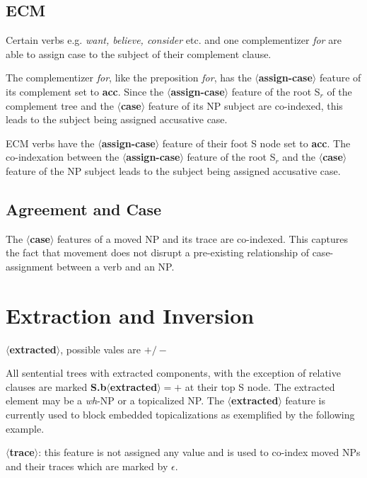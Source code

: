 \subsection{ECM}
Certain verbs e.g. {\em want, believe, consider} etc. and one complementizer
{\em for} are able to assign case to the subject of their complement clause. 

The complementizer {\em for}, like the preposition {\em for}, has the
{\bf $\langle$assign-case$\rangle$} feature of its complement set to
{\bf acc}. Since the {\bf $\langle$assign-case$\rangle$} feature of
the root S$_{r}$ of the complement tree and the {\bf
$\langle$case$\rangle$} feature of its NP subject are co-indexed, this
leads to the subject being assigned accusative case.

ECM verbs have the {\bf $\langle$assign-case$\rangle$}  feature of their
foot S node set to {\bf acc}. The co-indexation between the 
{\bf $\langle$assign-case$\rangle$} feature of
the root S$_{r}$ and the {\bf $\langle$case$\rangle$} feature of the NP subject
leads to the subject being assigned accusative case.

\subsection{Agreement and Case}
The {\bf $\langle$case$\rangle$} features of a moved NP and its trace 
are co-indexed. This captures the fact that movement does not disrupt 
a pre-existing relationship of case-assignment between a verb and an NP.



\section{Extraction and Inversion}
{\bf $\langle$extracted$\rangle$}, possible vales are {\bf $+/-$}

All sentential trees with extracted components, with the exception of
relative clauses are marked {\bf S.b$\langle$extracted$\rangle = +$}
at their top S node. The extracted element may be a {\em wh}-NP or a
topicalized NP. The {\bf $\langle$extracted$\rangle$} feature 
is currently used to block embedded topicalizations as exemplified
by the following example.

{\bf $\langle$trace$\rangle$}: this feature is not assigned any value and
is used to co-index moved NPs and their traces which are marked by
$\epsilon$.

